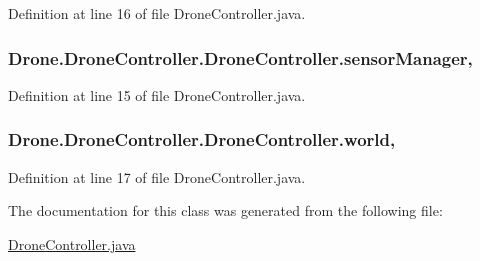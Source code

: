 Definition at line 16 of file Drone\+Controller.\+java.

\hypertarget{class_drone_1_1_drone_controller_1_1_drone_controller_a2a6367dbade6a593a916562761722ebb}{}
\subsubsection[{sensor\+Manager}]{ Drone.\+Drone\+Controller.\+Drone\+Controller.\+sensor\+Manager\hspace{0.3cm}{\ttfamily [static]}, {\ttfamily [private]}}\label{class_drone_1_1_drone_controller_1_1_drone_controller_a2a6367dbade6a593a916562761722ebb}


Definition at line 15 of file Drone\+Controller.\+java.

\hypertarget{class_drone_1_1_drone_controller_1_1_drone_controller_a486a9ca2889ba1e6281728d36e4b52f2}{}
\subsubsection[{world}]{ Drone.\+Drone\+Controller.\+Drone\+Controller.\+world\hspace{0.3cm}{\ttfamily [static]}, {\ttfamily [private]}}\label{class_drone_1_1_drone_controller_1_1_drone_controller_a486a9ca2889ba1e6281728d36e4b52f2}


Definition at line 17 of file Drone\+Controller.\+java.



The documentation for this class was generated from the following file\+:\begin{DoxyCompactItemize}
\item 
\hyperlink{_drone_controller_8java}{Drone\+Controller.\+java}\end{DoxyCompactItemize}
